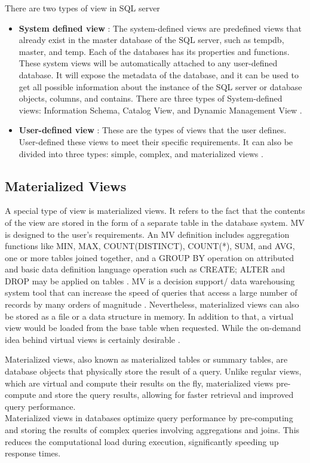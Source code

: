 There are two types of view in SQL server
\begin{itemize}
    \item \textbf{System defined view }: The system-defined views are predefined views that already exist in the master database of the SQL server, such as tempdb, master, and temp. Each of the databases has its properties and functions. These system views will be automatically attached to any user-defined database. It will expose the metadata of the database, and it can be used to get all possible information about the instance of the SQL server or database objects, columns, and contains. There are three types of System-defined views: Information Schema, Catalog View, and Dynamic Management View \cite{chauhan-2024}.
    \item \textbf{User-defined view }: These are the types of views that the user defines. User-defined these views to meet their specific requirements. It can also be divided into three types: simple, complex, and materialized views \cite{javapoint-author-2024}.
\end{itemize}
   
\subsection{Materialized Views}
 A special type of view is materialized views. It refers to the fact that the contents of the view are stored in the form of a separate table in the database system. MV is designed to the user's requirements. An MV definition includes aggregation functions like MIN, MAX, COUNT(DISTINCT), COUNT(*), SUM, and AVG, one or more tables joined together, and a GROUP BY operation on attributed and basic data definition language operation such as CREATE; ALTER and DROP may be applied on tables \cite{Kardel_Thakare}. MV is a decision support/ data warehousing system tool that can increase the speed of queries that access a large number of records by many orders of magnitude \cite{Kishan_Sainath_no_date}. Nevertheless, materialized views can also be stored as a file or a data structure in memory. In addition to that, a virtual view would be loaded from the base table when requested. While the on-demand idea behind virtual views is certainly desirable \cite{jan-no-date,ashadevi-2024}.

\begin{definition}
Materialized views, also known as materialized tables or summary tables, are database objects that physically store the result of a query. Unlike regular views, which are virtual and compute their results on the fly, materialized views pre-compute and store the query results, allowing for faster retrieval and improved query performance.\\
Materialized views in databases optimize query performance by pre-computing and storing the results of complex queries involving aggregations and joins. This reduces the computational load during execution, significantly speeding up response times.

\end{definition}

